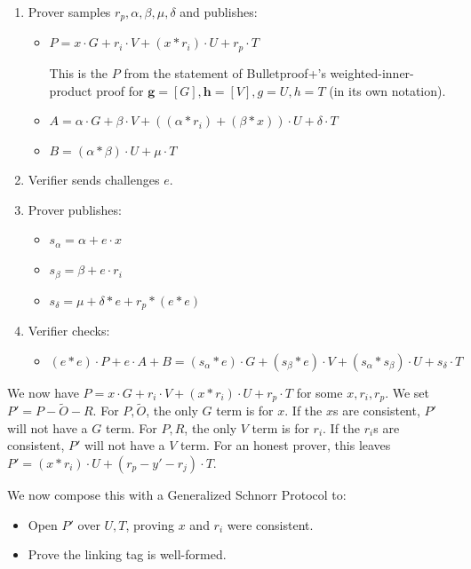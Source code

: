 \documentclass[]{article}
\begin{document}
\begin{enumerate}
	\item
	Prover samples $r_p, \alpha, \beta, \mu, \delta$ and publishes:
	\begin{itemize}
		\item
		$P = x \cdot G + r_i \cdot V + (x * r_i) \cdot U + r_p \cdot T$
		
		This is the $P$ from the statement of Bulletproof+'s weighted-inner-product proof for $\boldsymbol{g} = [G], \boldsymbol{h} = [V], g = U, h = T$ (in its own notation).
		\item
		$A = \alpha \cdot G + \beta \cdot V + ((\alpha * r_i) + (\beta * x)) \cdot U + \delta \cdot T$
		\item
		$B = (\alpha * \beta) \cdot U + \mu \cdot T$
	\end{itemize}
	\item
	Verifier sends challenges $e$.
	\item
	Prover publishes:
	\begin{itemize}
		\item
		$s_\alpha = \alpha + e \cdot x$	
		\item
		$s_\beta = \beta + e \cdot r_i$
		\item
		$s_\delta = \mu + \delta * e + r_p * (e * e)$
	\end{itemize}
	\item
	Verifier checks:
	\begin{itemize}
		\item
		$(e * e) \cdot P + e \cdot A + B = (s_\alpha * e) \cdot G + (s_\beta * e) \cdot V + (s_\alpha * s_\beta) \cdot U + s_\delta \cdot T$
	\end{itemize}
\end{enumerate}

We now have $P = x \cdot G + r_i \cdot V + (x * r_i) \cdot U + r_p \cdot T$ for some $x, r_i, r_p$. We set $P' = P - \tilde{O} - R$. For $P, \tilde{O}$, the only $G$ term is for $x$. If the $x$s are consistent, $P'$ will not have a $G$ term. For $P, R$, the only $V$ term is for $r_i$. If the $r_i$s are consistent, $P'$ will not have a $V$ term. For an honest prover, this leaves $P' = (x * r_i) \cdot U + (r_p - y' - r_j) \cdot T$.

We now compose this with a Generalized Schnorr Protocol to:
\begin{itemize}
	\item Open $P'$ over $U, T$, proving $x$ and $r_i$ were consistent.
	\item Prove the linking tag is well-formed.
\end{itemize}
\end{document}
